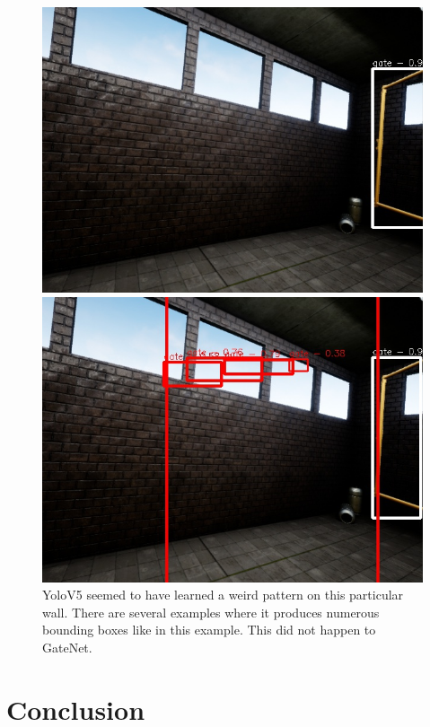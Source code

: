 \documentclass{article}
\begin{document}
\begin{figure}
			\begin{minipage}{0.3\linewidth}
		\includegraphics[width=\linewidth]{fig/gate_comp5}
	\end{minipage}
	\begin{minipage}{0.3\linewidth}
		\includegraphics[width=\linewidth]{fig/v2_comp5}
	\end{minipage}
	\caption{YoloV5 seemed to have learned a weird pattern on this particular wall. There are several examples where it produces numerous bounding boxes like in this example. This did not happen to GateNet.}
		\label{fig:examples}
\end{figure}


\section{Conclusion}
\end{document}
